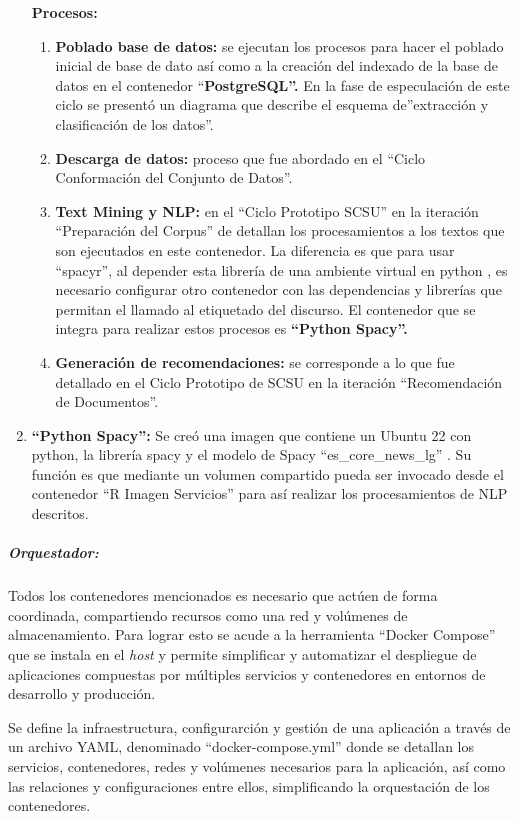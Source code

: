\documentclass[
  12pt,
  openany]{book}
\providecommand{\tightlist}{%
  \setlength{\itemsep}{0pt}\setlength{\parskip}{0pt}}
\begin{document}
\begin{enumerate}
  \textbf{Procesos:}

  \begin{enumerate}
  \def\labelenumii{\arabic{enumii}.}
  \tightlist
  \item
    \textbf{Poblado base de datos:} se ejecutan los procesos para hacer el poblado inicial de base de dato así como a la creación del indexado de la base de datos en el contenedor ``\textbf{PostgreSQL''.} En la fase de especulación de este ciclo se presentó un diagrama que describe el esquema de''extracción y clasificación de los datos''.
  \item
    \textbf{Descarga de datos:} proceso que fue abordado en el ``Ciclo Conformación del Conjunto de Datos''.
  \item
    \textbf{Text Mining y NLP:} en el ``Ciclo Prototipo SCSU'' en la iteración ``Preparación del Corpus'' de detallan los procesamientos a los textos que son ejecutados en este contenedor. La diferencia es que para usar ``spacyr'', al depender esta librería de una ambiente virtual en python , es necesario configurar otro contenedor con las dependencias y librerías que permitan el llamado al etiquetado del discurso. El contenedor que se integra para realizar estos procesos es \textbf{``Python Spacy''.}
  \item
    \textbf{Generación de recomendaciones:} se corresponde a lo que fue detallado en el Ciclo Prototipo de SCSU en la iteración ``Recomendación de Documentos''.
  \end{enumerate}
\item
  \textbf{``Python Spacy'':} Se creó una imagen que contiene un Ubuntu 22 con python, la librería spacy y el modelo de Spacy ``es\_core\_news\_lg'' . Su función es que mediante un volumen compartido pueda ser invocado desde el contenedor ``R Imagen Servicios'' para así realizar los procesamientos de NLP descritos.
\end{enumerate}

\hypertarget{orquestador-1}{%
\subparagraph{Orquestador:}\label{orquestador-1}}

Todos los contenedores mencionados es necesario que actúen de forma coordinada, compartiendo recursos como una red y volúmenes de almacenamiento. Para lograr esto se acude a la herramienta ``Docker Compose'' que se instala en el \emph{host} y permite simplificar y automatizar el despliegue de aplicaciones compuestas por múltiples servicios y contenedores en entornos de desarrollo y producción.

Se define la infraestructura, configurarción y gestión de una aplicación a través de un archivo YAML, denominado ``docker-compose.yml'' donde se detallan los servicios, contenedores, redes y volúmenes necesarios para la aplicación, así como las relaciones y configuraciones entre ellos, simplificando la orquestación de los contenedores.
\end{document}
